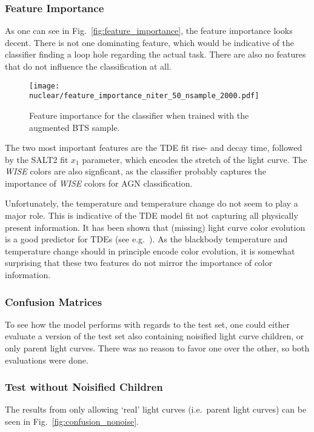 \subsubsection{Feature Importance}
As one can see in Fig.~\ref{fig:feature_importance}, the feature importance looks decent. There is not one dominating feature, which would be indicative of the classifier finding a loop hole regarding the actual task. There are also no features that do not influence the classification at all.

\begin{figure}[htpb]
    \texttt{[image: nuclear/feature\_importance\_niter\_50\_nsample\_2000.pdf]}
    \caption[Feature importance]{Feature importance for the classifier when trained with the augmented BTS sample.}
\end{figure}

The two most important features are the TDE fit rise- and decay time, followed by the SALT2 fit $x_1$ parameter, which encodes the stretch of the light curve. The \textit{WISE} colors are also signficant, as the classifier probably captures the importance of \textit{WISE} colors for AGN classification.

Unfortunately, the temperature and temperature change do not seem to play a major role. This is indicative of the TDE model fit not capturing all physically present information. It has been shown that (missing) light curve color evolution is a good predictor for TDEs (see e.g.~\cite{Velzen2021a}). As the blackbody temperature and temperature change should in principle encode color evolution, it is somewhat surprising that these two features do not mirror the importance of color information.

\subsubsection{Confusion Matrices}
To see how the model performs with regards to the test set, one could either evaluate a version of the test set also containing noisified light curve children, or only parent light curves. There was no reason to favor one over the other, so both evaluations were done.

\subsubsection{Test without Noisified Children}
The results from only allowing `real' light curves (i.e.~parent light curves) can be seen in Fig.~\ref{fig:confusion_nonoise}.

